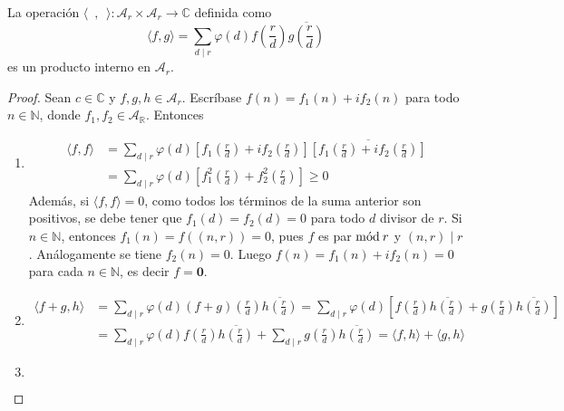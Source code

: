 \begin{proposition}
La operación $\langle \phantom{f},\phantom{g} \rangle : \mathcal{A}_r\times \mathcal{A}_r \longrightarrow \mathbb{C}$ definida como
\begin{equation*}
    \langle f,g \rangle = \sum_{d \mid r} \varphi(d) f \left( \frac{r}{d} \right) \overline{g \left( \frac{r}{d} \right)}
\end{equation*}
es un producto interno en $\mathcal{A}_r$.
\end{proposition}
\begin{proof}
Sean $c \in \mathbb{C}$ y $f,g,h \in \mathcal{A}_r$. Escríbase $f(n)=f_1(n)+ i f_2(n)$ para todo $n \in \mathbb{N}$, donde $f_1,f_2 \in \mathcal{A}_{\mathbb{R}}$. Entonces
\begin{enumerate}[label=\textnormal{(\roman*)}]
\item \begin{align*}
        \langle f,f \rangle & = \sum_{d \mid r} \varphi(d) \left[ f_1 \left( \frac{r}{d} \right) + i f_2 \left( \frac{r}{d} \right) \right] \overline{\left[ f_1 \left( \frac{r}{d} \right) + i f_2 \left( \frac{r}{d} \right) \right]} \\
                            & = \sum_{d \mid r} \varphi(d) \left[ f_1^2 \left( \frac{r}{d} \right) + f_2^2 \left( \frac{r}{d} \right) \right] \ge 0
\end{align*}
Además, si $\langle f,f \rangle=0$, como todos los términos de la suma anterior son positivos, se debe tener que $f_1(d)=f_2(d)=0$ para todo $d$ divisor de $r$. Si $n \in \mathbb{N}$, entonces $f_1(n)=f((n,r))=0$, pues $f$ es par $\mathrm{m\acute{o}d\:}r$ y $(n,r) \mid r$. Análogamente se tiene $f_2(n)=0$. Luego $f(n)=f_1(n)+i f_2(n)=0$ para cada $n \in \mathbb{N}$, es decir $f=\mathbf{0}$.
\item \begin{align*}
        \langle f+g,h \rangle & = \sum_{d \mid r} \varphi(d) (f+g) \left( \frac{r}{d} \right) \overline{h \left( \frac{r}{d} \right)} = \sum_{d \mid r} \varphi(d) \left[ f \left( \frac{r}{d} \right) \overline{h \left( \frac{r}{d} \right)} + g \left( \frac{r}{d} \right) \overline{h \left( \frac{r}{d} \right)} \right] \\
                              & = \sum_{d \mid r} \varphi(d) f \left( \frac{r}{d} \right) \overline{h \left( \frac{r}{d} \right)} + \sum_{d \mid r} g \left( \frac{r}{d} \right) \overline{h \left( \frac{r}{d} \right)} = \langle f,h \rangle + \langle g,h \rangle
\end{align*}
\item \begin{equation*}

\end{equation*}
\end{enumerate}
\end{proof}
